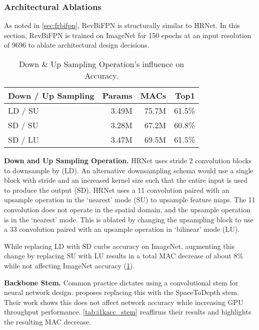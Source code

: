 \documentclass{article}
\begin{document}
\subsubsection{Architectural Ablations}
\label{appx:Ablations}

As noted in \cref{sec:frbifpn}, RevBiFPN is structurally similar to HRNet.
In this section, RevBiFPN is trained on ImageNet for 150 epochs at an input resolution of 9696 to ablate architectural design decisions.

\begin{table}
    \caption{Down \& Up Sampling Operation's influence on Accuracy.}
        \vskip 10pt
        \centering
        \small
        \sc
        \begin{tabular}{lrrr}
            \toprule
            Down / Up Sampling & Params &  MACs & Top1   \\ \midrule
            LD / SU            & 3.49M  & 75.7M & 61.5\% \\ 
            SD / SU            & 3.28M  & 67.2M & 60.8\% \\ 
            SD / LU            & 3.47M  & 69.5M & 61.5\% \\ 
            \bottomrule
        \end{tabular}
        \vskip -7pt
        \label{tab:i1kacc_dusample}
\end{table}

\textbf{Down and Up Sampling Operation.} HRNet uses  stride 2 convolution blocks to downsample by  (LD).
An alternative downsampling schema would use a single block with stride  and an increased kernel size such that the entire input is used to produce the output (SD).
HRNet uses a 11 convolution paired with an upsample operation in the `nearest' mode (SU) to upsample feature maps.
The 11 convolution does not operate in the spatial domain, and the upsample operation is in the `nearest' mode.
This is ablated by changing the upsampling block to use a 33 convolution paired with an upsample operation in `bilinear' mode (LU).

While replacing LD with SD curbs accuracy on ImageNet, augmenting this change by replacing SU with LU results in a total MAC decrease of about 8\% while not affecting ImageNet accuracy (\cref{tab:i1kacc_dusample}).


\textbf{Backbone Stem.} Common practice dictates using a convolutional stem for neural network design.
\citet{ridnik2020tresnet} proposes replacing this with the SpaceToDepth stem.
Their work shows this does not affect network accuracy while increasing GPU throughput performance.
\cref{tab:i1kacc_stem} reaffirms their results and highlights the resulting MAC decrease.
\end{document}

